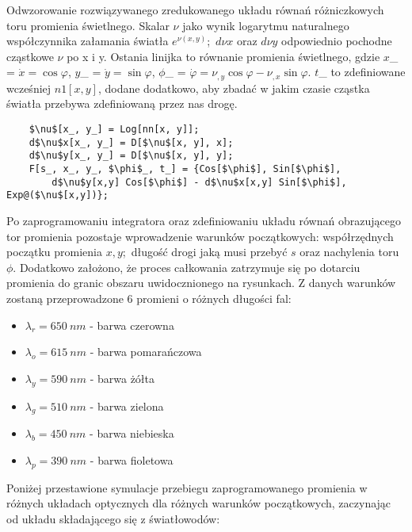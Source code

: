 Odwzorowanie rozwiązywanego zredukowanego układu równań różniczkowych toru promienia świetlnego. Skalar $\nu$ jako wynik logarytmu naturalnego współczynnika załamania światła $e^{\nu(x,y)}$;~$d\nu x$ oraz $d\nu y$ odpowiednio pochodne cząstkowe $\nu$ po x i y. Ostania linijka to równanie promienia świetlnego, gdzie $x$\_ = $\dot{x}=\cos{\varphi}$, $y$\_ = $\dot{y}=\sin{\varphi}$, $\phi$\_ = $\dot{\varphi}=\nu_{,y}\cos{\varphi}-\nu_{,x}\sin{\varphi}$. $t$\_ to zdefiniowane wcześniej $n1[x,y]$, dodane dodatkowo, aby zbadać w jakim czasie cząstka światła przebywa zdefiniowaną przez nas drogę.
\begin{lstlisting}
    $\nu$[x_, y_] = Log[nn[x, y]];
    d$\nu$x[x_, y_] = D[$\nu$[x, y], x];
    d$\nu$y[x_, y_] = D[$\nu$[x, y], y];
    F[s_, x_, y_, $\phi$_, t_] = {Cos[$\phi$], Sin[$\phi$],
        d$\nu$y[x,y] Cos[$\phi$] - d$\nu$x[x,y] Sin[$\phi$], Exp@($\nu$[x,y])};
\end{lstlisting}
Po zaprogramowaniu integratora oraz zdefiniowaniu układu równań obrazującego tor promienia pozostaje wprowadzenie warunków początkowych: współrzędnych początku promienia $x, y$;~długość drogi jaką musi przebyć $s$ oraz nachylenia toru $\phi$. Dodatkowo założono, że proces całkowania zatrzymuje się po dotarciu promienia do granic obszaru uwidocznionego na rysunkach. Z danych warunków zostaną przeprowadzone 6 promieni o różnych długości fal:
\begin{itemize}
    \item $\lambda_{r} = 650 ~ nm$ - barwa czerowna
    \item $\lambda_{o} = 615 ~ nm$ - barwa pomarańczowa
    \item $\lambda_{y} = 590 ~ nm$ - barwa żółta
    \item $\lambda_{g} = 510 ~ nm$ - barwa zielona
    \item $\lambda_{b} = 450 ~ nm$ - barwa niebieska
    \item $\lambda_{p} = 390 ~ nm$ - barwa fioletowa
\end{itemize}
Poniżej przestawione symulacje przebiegu zaprogramowanego promienia w różnych układach optycznych dla różnych warunków początkowych, zaczynając od układu składającego się z światłowodów:

